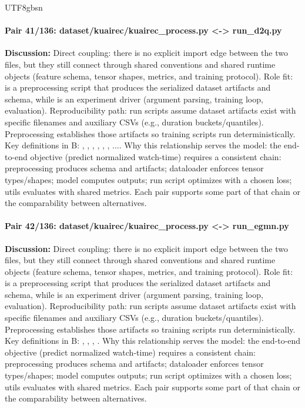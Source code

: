 \documentclass[11pt]{article}
\begin{document}
\begin{CJK*}{UTF8}{gbsn}
\paragraph{Pair 41/136: dataset/kuairec/kuairec\_process.py <-> run\_d2q.py}
\textbf{Discussion:} Direct coupling: there is no explicit import edge between the two files, but they still connect through shared conventions and shared runtime objects (feature schema, tensor shapes, metrics, and training protocol). Role fit: \texttt{} is a preprocessing script that produces the serialized dataset artifacts and schema, while \texttt{} is an experiment driver (argument parsing, training loop, evaluation). Reproducibility path: run scripts assume dataset artifacts exist with specific filenames and auxiliary CSVs (e.g., duration buckets/quantiles). Preprocessing establishes those artifacts so training scripts run deterministically. Key definitions in B: \texttt{}, \texttt{}, \texttt{}, \texttt{}, \texttt{}, \texttt{}, .... Why this relationship serves the model: the end-to-end objective (predict normalized watch-time) requires a consistent chain: preprocessing produces schema and artifacts; dataloader enforces tensor types/shapes; model computes outputs; run script optimizes with a chosen loss; utils evaluates with shared metrics. Each pair supports some part of that chain or the comparability between alternatives.

\paragraph{Pair 42/136: dataset/kuairec/kuairec\_process.py <-> run\_egmn.py}
\textbf{Discussion:} Direct coupling: there is no explicit import edge between the two files, but they still connect through shared conventions and shared runtime objects (feature schema, tensor shapes, metrics, and training protocol). Role fit: \texttt{} is a preprocessing script that produces the serialized dataset artifacts and schema, while \texttt{} is an experiment driver (argument parsing, training loop, evaluation). Reproducibility path: run scripts assume dataset artifacts exist with specific filenames and auxiliary CSVs (e.g., duration buckets/quantiles). Preprocessing establishes those artifacts so training scripts run deterministically. Key definitions in B: \texttt{}, \texttt{}, \texttt{}, \texttt{}. Why this relationship serves the model: the end-to-end objective (predict normalized watch-time) requires a consistent chain: preprocessing produces schema and artifacts; dataloader enforces tensor types/shapes; model computes outputs; run script optimizes with a chosen loss; utils evaluates with shared metrics. Each pair supports some part of that chain or the comparability between alternatives.


\end{CJK*}
\end{document}
